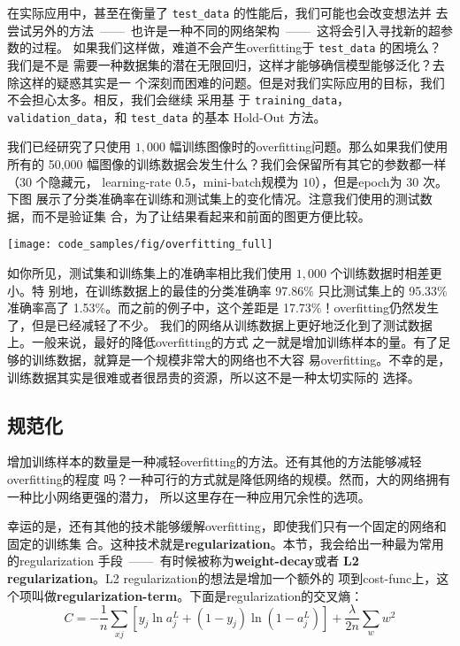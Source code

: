 在实际应用中，甚至在衡量了 \lstinline!test_data! 的性能后，我们可能也会改变想法并
去尝试另外的方法~——~也许是一种不同的网络架构~——~这将会引入寻找新的超参数的过程。
如果我们这样做，难道不会产生\gls*{overfitting}于 \lstinline!test_data! 的困境么？我们是不是
需要一种数据集的潜在无限回归，这样才能够确信模型能够泛化？去除这样的疑惑其实是一
个深刻而困难的问题。但是对我们实际应用的目标，我们不会担心太多。相反，我们会继续
采用基
于 \lstinline!training_data!，\lstinline!validation_data!，和
\lstinline!test_data! 的基本 Hold-Out 方法。

我们已经研究了只使用 $1,000$ 幅训练图像时的\gls*{overfitting}问题。那么如果我们使用所有的
50,000 幅图像的训练数据会发生什么？我们会保留所有其它的参数都一样（$30$ 个隐藏元，
  \gls*{learning-rate} $0.5$，\gls*{mini-batch}规模为 $10$），但是\gls*{epoch}为 30 次。下图
展示了分类准确率在训练和测试集上的变化情况。注意我们使用的测试数据，而不是验证集
合，为了让结果看起来和前面的图更方便比较。
\begin{center}
  \texttt{[image: code\_samples/fig/overfitting\_full]}
\end{center}

如你所见，测试集和训练集上的准确率相比我们使用 $1,000$ 个训练数据时相差更小。特
别地，在训练数据上的最佳的分类准确率 97.86\% 只比测试集上的 95.33\% 准确率高了
1.53\%。而之前的例子中，这个差距是 17.73\%！\gls*{overfitting}仍然发生了，但是已经减轻了不少。
我们的网络从训练数据上更好地泛化到了测试数据上。一般来说，最好的降低\gls*{overfitting}的方式
之一就是增加训练样本的量。有了足够的训练数据，就算是一个规模非常大的网络也不大容
易\gls*{overfitting}。不幸的是，训练数据其实是很难或者很昂贵的资源，所以这不是一种太切实际的
选择。

\subsection{规范化}

增加训练样本的数量是一种减轻\gls*{overfitting}的方法。还有其他的方法能够减轻\gls*{overfitting}的程度
吗？一种可行的方式就是降低网络的规模。然而，大的网络拥有一种比小网络更强的潜力，
所以这里存在一种应用冗余性的选项。

幸运的是，还有其他的技术能够缓解\gls*{overfitting}，即使我们只有一个固定的网络和固定的训练集
合。这种技术就是\textbf{\gls{regularization}}。本节，我会给出一种最为常用的\gls*{regularization}
手段~——~有时候被称为\textbf{\gls{weight-decay}}或者 \textbf{L2 \gls*{regularization}}。L2 \gls*{regularization}的想法是增加一个额外的
项到\gls*{cost-func}上，这个项叫做\textbf{\gls{regularization-term}}。下面是\gls*{regularization}的交叉熵：
\begin{equation}
  C = -\frac{1}{n} \sum_{xj} \left[ y_j \ln a^L_j+(1-y_j) \ln
  (1-a^L_j)\right] + \frac{\lambda}{2n} \sum_w w^2
\label{eq:85}\tag{85}
\end{equation}

